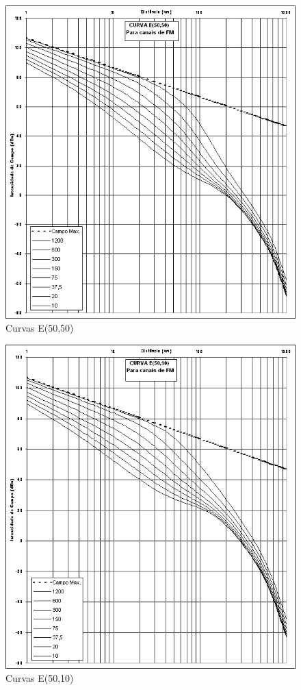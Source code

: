 \begin{figure}[!htb]
\centering
\includegraphics[scale=0.80]{./figuras/e5050.jpg}
\caption{Curvas E(50,50)}
\label{e5050}
\end{figure}

\begin{figure}[!htb]
\centering
\includegraphics[scale=0.80]{./figuras/e5010.jpg}
\caption{Curvas E(50,10)}
\label{e5010}
\end{figure}


